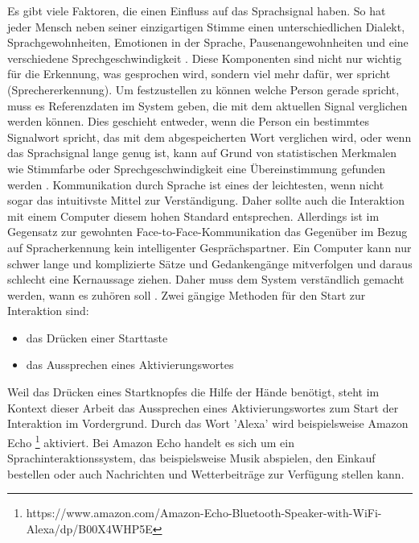 \newline \newline
Es gibt viele Faktoren, die einen Einfluss auf das Sprachsignal haben. So hat jeder Mensch neben seiner einzigartigen Stimme einen unterschiedlichen Dialekt, Sprachgewohnheiten, Emotionen in der Sprache, Pausenangewohnheiten und eine verschiedene Sprechgeschwindigkeit \cite{KaufmannPfisterSprache}. Diese Komponenten sind nicht nur wichtig für die Erkennung, was gesprochen wird, sondern viel mehr dafür, wer spricht (Sprechererkennung).
\newline \newline
Um festzustellen zu können welche Person gerade spricht, muss es Referenzdaten im System geben, die mit dem aktuellen Signal verglichen werden können. Dies geschieht entweder, wenn die Person ein bestimmtes Signalwort spricht, das mit dem abgespeicherten Wort verglichen wird, oder wenn das Sprachsignal lange genug ist, kann auf Grund von statistischen Merkmalen wie \zB Stimmfarbe oder Sprechgeschwindigkeit eine Übereinstimmung gefunden werden \cite{KaufmannPfisterSprache}. 
\newline \newline
Kommunikation durch Sprache ist eines der leichtesten, wenn nicht sogar das \mbox{intuitivste} Mittel zur Verständigung. Daher sollte auch die Interaktion mit einem Computer diesem hohen Standard entsprechen. Allerdings ist im Gegensatz zur gewohnten Face-to-Face-Kommunikation das Gegenüber im Bezug auf Spracherkennung kein intelligenter Gesprächspartner. Ein Computer kann nur schwer lange und komplizierte Sätze und Gedankengänge mitverfolgen und daraus schlecht eine Kernaussage ziehen. Daher muss dem System verständlich gemacht werden, wann es zuhören soll \cite{SpeechInteraction}.
Zwei gängige \mbox{Methoden} für den Start zur Interaktion sind:
\begin{itemize}
      \item das Drücken einer Starttaste
      \item das Aussprechen eines Aktivierungswortes
\end{itemize}
\vspace{\baselineskip}
Weil das Drücken eines Startknopfes die Hilfe der Hände benötigt, steht im Kontext dieser Arbeit das Aussprechen eines Aktivierungswortes zum Start der Interaktion im Vordergrund. Durch das Wort 'Alexa' wird beispielsweise Amazon Echo%
\footnote{https://www.amazon.com/Amazon-Echo-Bluetooth-Speaker-with-WiFi-Alexa/dp/B00X4WHP5E}
%
aktiviert. Bei Amazon Echo handelt es sich um ein Sprachinteraktionssystem, das beispielsweise Musik abspielen, den Einkauf bestellen oder auch Nachrichten und Wetterbeiträge zur Verfügung stellen kann.
